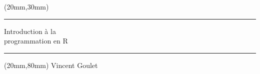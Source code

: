 \documentclass[letterpaper,11pt]{memoir}
\begin{document}
\begin{textblock*}{176mm}(20mm,30mm)
  \sffamily
  \fontsize{42}{42}\selectfont
  \rule{\linewidth}{0.5pt}
  Introduction à la \\
  programmation en R \\[-19pt]
  \rule{\linewidth}{0.5pt}
\end{textblock*}

\begin{textblock*}{176mm}(20mm,80mm)
  \sffamily
  \fontsize{24}{24}\selectfont
  Vincent Goulet
\end{textblock*}

\mbox{}

\newpage
\end{document}
